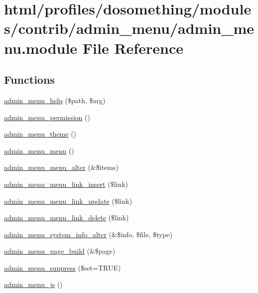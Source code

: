 \hypertarget{admin__menu_8module}{
\section{html/profiles/dosomething/modules/contrib/admin\_\-menu/admin\_\-menu.module File Reference}
\label{admin__menu_8module}
}
\subsection*{Functions}
\begin{DoxyCompactItemize}
\item 
\hyperlink{admin__menu_8module_ab8091736c23e24e82ac4954efd6b9a40}{admin\_\-menu\_\-help} (\$path, \$arg)
\item 
\hyperlink{admin__menu_8module_a3426d8ce72ca5c37740a6e7a1aa269c1}{admin\_\-menu\_\-permission} ()
\item 
\hyperlink{admin__menu_8module_a7d7afd748df0dc6b8f912122cab9990c}{admin\_\-menu\_\-theme} ()
\item 
\hyperlink{admin__menu_8module_a890b6285791642bfa4420583457fb473}{admin\_\-menu\_\-menu} ()
\item 
\hyperlink{admin__menu_8module_a5215739b9f88a38d14ba99f5413b904e}{admin\_\-menu\_\-menu\_\-alter} (\&\$items)
\item 
\hyperlink{admin__menu_8module_aa2fdb44794becd942d82791196fb3175}{admin\_\-menu\_\-menu\_\-link\_\-insert} (\$link)
\item 
\hyperlink{admin__menu_8module_adde167e89dea1bccbf8f74d0dd9844a6}{admin\_\-menu\_\-menu\_\-link\_\-update} (\$link)
\item 
\hyperlink{admin__menu_8module_a0fb7c76d79321ad3bc3cbb6566c455a2}{admin\_\-menu\_\-menu\_\-link\_\-delete} (\$link)
\item 
\hyperlink{admin__menu_8module_a3694a156592ca88ad768a279d4524384}{admin\_\-menu\_\-system\_\-info\_\-alter} (\&\$info, \$file, \$type)
\item 
\hyperlink{admin__menu_8module_a8677d20e73452e73b868bf871abf57a1}{admin\_\-menu\_\-page\_\-build} (\&\$page)
\item 
\hyperlink{admin__menu_8module_a17cd6b917e0b38e8cd5392ae934473e0}{admin\_\-menu\_\-suppress} (\$set=TRUE)
\item 
\hyperlink{admin__menu_8module_ab95b2814fc91e5810e361f155416514f}{admin\_\-menu\_\-js} ()
\item 

\end{DoxyCompactItemize}
